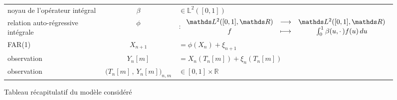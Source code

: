 \begin{figure}[H]
\begin{tabularx}{\textwidth}{XcX}
		\midrule
		noyau de l'opérateur intégral                & $\beta$                                     & $\in \mathds L^2([0,1])$                                                                                           \\
		relation auto-régressive intégrale           & $\phi$                                      & $: \func{\mathds L^2([0,1], \mathds R)}{\mathds L^2([0,1], \mathds R)}{f}{\int_0^1 \beta(u, \cdot \, )f(u) \, du}$ \\
		FAR(1)                                       & $X_{n+1}$                                   & $= \phi( X_n )+ \xi_{n+1}$                                                                                         \\
		\midrule
		observation                                  & $Y_n[m]$                                    & $= X_n( T_n[m] ) + \xi_n( T_n[m] )$                                                                                \\
		observation                                  & $\bigl( T_n[m] \, , \, Y_n[m] \bigr)_{n,m}$ & $\in [0,1] \times \mathds R$                                                                                       \\
		\bottomrule
	\end{tabularx}
	\caption{Tableau récapitulatif du modèle considéré}
	\label{tab:model}
\end{figure}